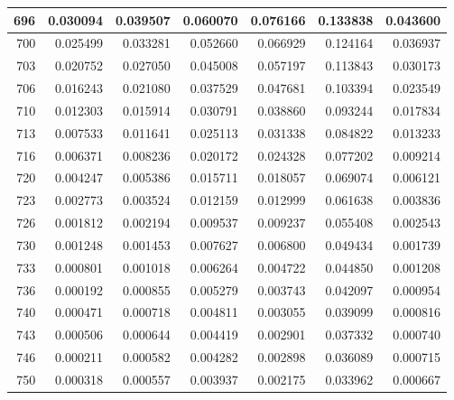 \documentclass[11pt]{article}
\begin{document}
\begin{appendices}
\begin{longtable}{|r|r|r|r|r|r|r|}
	696 & 0.030094 & 0.039507 & 0.060070 & 0.076166 & 0.133838 & 0.043600 \\ \hline
	700 & 0.025499 & 0.033281 & 0.052660 & 0.066929 & 0.124164 & 0.036937 \\ \hline
	703 & 0.020752 & 0.027050 & 0.045008 & 0.057197 & 0.113843 & 0.030173 \\ \hline
	706 & 0.016243 & 0.021080 & 0.037529 & 0.047681 & 0.103394 & 0.023549 \\ \hline
	710 & 0.012303 & 0.015914 & 0.030791 & 0.038860 & 0.093244 & 0.017834 \\ \hline
	713 & 0.007533 & 0.011641 & 0.025113 & 0.031338 & 0.084822 & 0.013233 \\ \hline
	716 & 0.006371 & 0.008236 & 0.020172 & 0.024328 & 0.077202 & 0.009214 \\ \hline
	720 & 0.004247 & 0.005386 & 0.015711 & 0.018057 & 0.069074 & 0.006121 \\ \hline
	723 & 0.002773 & 0.003524 & 0.012159 & 0.012999 & 0.061638 & 0.003836 \\ \hline
	726 & 0.001812 & 0.002194 & 0.009537 & 0.009237 & 0.055408 & 0.002543 \\ \hline
	730 & 0.001248 & 0.001453 & 0.007627 & 0.006800 & 0.049434 & 0.001739 \\ \hline
	733 & 0.000801 & 0.001018 & 0.006264 & 0.004722 & 0.044850 & 0.001208 \\ \hline
	736 & 0.000192 & 0.000855 & 0.005279 & 0.003743 & 0.042097 & 0.000954 \\ \hline
	740 & 0.000471 & 0.000718 & 0.004811 & 0.003055 & 0.039099 & 0.000816 \\ \hline
	743 & 0.000506 & 0.000644 & 0.004419 & 0.002901 & 0.037332 & 0.000740 \\ \hline
	746 & 0.000211 & 0.000582 & 0.004282 & 0.002898 & 0.036089 & 0.000715 \\ \hline
	750 & 0.000318 & 0.000557 & 0.003937 & 0.002175 & 0.033962 & 0.000667 \\ \hline
\end{longtable}


\end{appendices}
\end{document}
